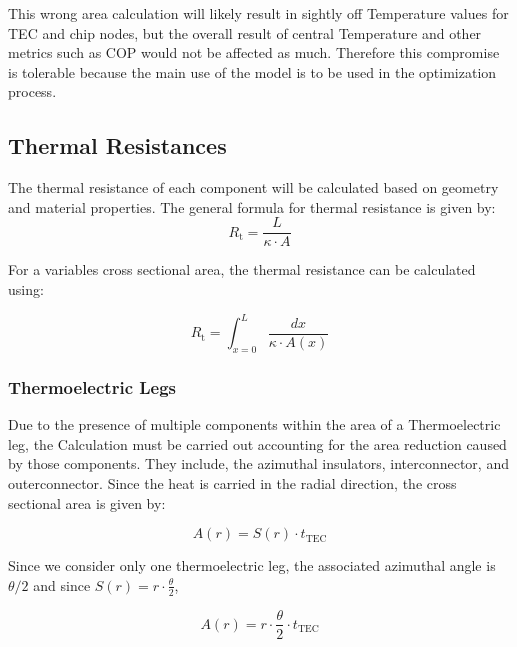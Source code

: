 \documentclass[10pt,a4paper,twocolumn]{article}
\begin{document}
This wrong area calculation will likely result in sightly off Temperature values for TEC and chip nodes, but the overall result of central Temperature and other metrics such as COP would not be affected as much. Therefore this compromise is tolerable because the main use of the model is to be used in the optimization process.

\subsection{Thermal Resistances}

The thermal resistance of each component will be calculated based on geometry and material properties. The general formula for thermal resistance is given by:
\begin{equation}
	R_{\text{t}} = \frac{L}{\kappa \cdot A}
	\label{eq:thermal_resistance_r}
\end{equation}

For a variables cross sectional area, the thermal resistance can be calculated using:

\begin{equation}
	R_{\text{t}} = \int_{x=0}^{L} \frac{dx}{\kappa \cdot A(x)}
	\label{eq:resistance_r_int}
\end{equation}

\subsubsection{Thermoelectric Legs}

Due to the presence of multiple components within the area of a Thermoelectric leg, the Calculation must be carried out accounting for the area reduction caused by those components. They include, the azimuthal insulators, interconnector, and outerconnector. Since the heat is carried in the radial direction, the cross sectional area is given by:

\begin{equation}
	A(r) = S(r) \cdot t_{\text{TEC}}
	\label{eq:annular_segment_radial_area}
\end{equation}

Since we consider only one thermoelectric leg, the associated azimuthal angle is $\theta/2$ and since $S(r) = r \cdot \frac{\theta}{2}$,

\begin{equation}
	A(r) = r \cdot \frac{\theta}{2} \cdot t_{\text{TEC}}
	\label{eq:cross_section_area_radial_dir}
\end{equation}
\end{document}
